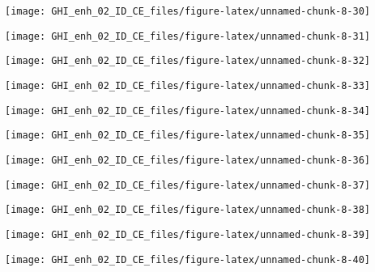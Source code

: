 \documentclass[
  10pt,
  a4paper,oneside]{article}
\begin{document}
\begin{center}\texttt{[image: GHI\_enh\_02\_ID\_CE\_files/figure-latex/unnamed-chunk-8-30]} \end{center}

\begin{center}\texttt{[image: GHI\_enh\_02\_ID\_CE\_files/figure-latex/unnamed-chunk-8-31]} \end{center}

\begin{center}\texttt{[image: GHI\_enh\_02\_ID\_CE\_files/figure-latex/unnamed-chunk-8-32]} \end{center}

\begin{center}\texttt{[image: GHI\_enh\_02\_ID\_CE\_files/figure-latex/unnamed-chunk-8-33]} \end{center}

\begin{center}\texttt{[image: GHI\_enh\_02\_ID\_CE\_files/figure-latex/unnamed-chunk-8-34]} \end{center}

\begin{center}\texttt{[image: GHI\_enh\_02\_ID\_CE\_files/figure-latex/unnamed-chunk-8-35]} \end{center}

\begin{center}\texttt{[image: GHI\_enh\_02\_ID\_CE\_files/figure-latex/unnamed-chunk-8-36]} \end{center}

\begin{center}\texttt{[image: GHI\_enh\_02\_ID\_CE\_files/figure-latex/unnamed-chunk-8-37]} \end{center}

\begin{center}\texttt{[image: GHI\_enh\_02\_ID\_CE\_files/figure-latex/unnamed-chunk-8-38]} \end{center}

\begin{center}\texttt{[image: GHI\_enh\_02\_ID\_CE\_files/figure-latex/unnamed-chunk-8-39]} \end{center}

\begin{center}\texttt{[image: GHI\_enh\_02\_ID\_CE\_files/figure-latex/unnamed-chunk-8-40]} \end{center}
\end{document}
